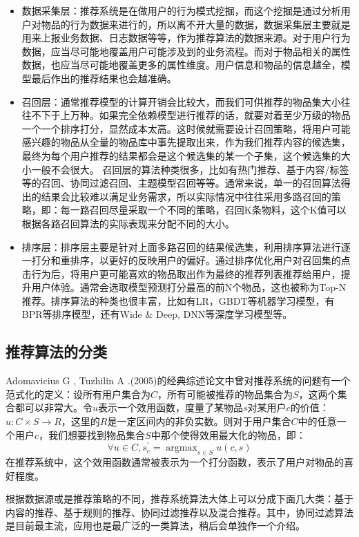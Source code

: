 \documentclass{article}
\begin{document}
	\begin{itemize}
	\item 数据采集层：推荐系统是在做用户的行为模式挖掘，而这个挖掘是通过分析用户对物品的行为数据来进行的，所以离不开大量的数据，数据采集层主要就是用来上报业务数据、日志数据等等，作为推荐算法的数据来源。对于用户行为数据，应当尽可能地覆盖用户可能涉及到的业务流程。而对于物品相关的属性数据，也应当尽可能地覆盖更多的属性维度。用户信息和物品的信息越全，模型最后作出的推荐结果也会越准确。
	\item 召回层：通常推荐模型的计算开销会比较大，而我们可供推荐的物品集大小往往不下于上万种。如果完全依赖模型进行推荐的话，就要对着至少万级的物品一个一个排序打分，显然成本太高。这时候就需要设计召回策略，将用户可能感兴趣的物品从全量的物品库中事先提取出来，作为我们推荐内容的候选集，最终为每个用户推荐的结果都会是这个候选集的某一个子集，这个候选集的大小一般不会很大。
	召回层的算法种类很多，比如有热门推荐、基于内容/标签等的召回、协同过滤召回、主题模型召回等等。通常来说，单一的召回算法得出的结果会比较难以满足业务需求，所以实际情况中往往采用多路召回的策略，即：每一路召回尽量采取一个不同的策略，召回K条物料，这个K值可以根据各路召回算法的实际表现来分配不同的大小。
	\item 排序层：排序层主要是针对上面多路召回的结果候选集，利用排序算法进行逐一打分和重排序，以更好的反映用户的偏好。通过排序优化用户对召回集的点击行为后，将用户更可能喜欢的物品取出作为最终的推荐列表推荐给用户，提升用户体验。通常会选取模型预测打分最高的前N个物品，这也被称为Top-N推荐。排序算法的种类也很丰富，比如有LR，GBDT等机器学习模型，有BPR等排序模型，还有Wide \& Deep, DNN等深度学习模型等。
	\end{itemize}

	\subsection{推荐算法的分类}
	Adomavicius G , Tuzhilin A .(2005)的经典综述论文中曾对推荐系统的问题有一个范式化的定义：设所有用户集合为$C$，所有可能被推荐的物品集合为$S$，这两个集合都可以非常大。令$u$表示一个效用函数，度量了某物品$s$对某用户$c$的价值：$u:C\times S\rightarrow R$，这里的$R$是一定区间内的非负实数。则对于用户集合$C$中的任意一个用户$c$，我们想要找到物品集合$S$中那个使得效用最大化的物品，即：
	$$\forall u\in C, s_c^{'}=\mathop{argmax}_{s\in S}u(c,s)$$
	在推荐系统中，这个效用函数通常被表示为一个打分函数，表示了用户对物品的喜好程度。

	根据数据源或是推荐策略的不同，推荐系统算法大体上可以分成下面几大类：基于内容的推荐、基于规则的推荐、协同过滤推荐以及混合推荐。其中，协同过滤算法是目前最主流，应用也是最广泛的一类算法，稍后会单独作一个介绍。
\end{document}
